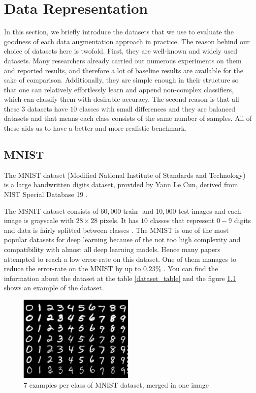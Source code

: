 \chapter{Data Representation}
\label{tit:data-representation}
In this section, we briefly introduce the datasets that we use to evaluate the goodness of each data
augmentation approach in practice. The reason behind our choice of datasets here is twofold. First,
they are well-known and widely used datasets. Many researchers already carried out numerous
experiments on them and reported results, and therefore a lot of baseline results are available for
the sake of comparison. Additionally, they are simple enough in their structure so that one can
relatively effortlessly learn and append non-complex classifiers, which can classify them with
desirable accuracy. The second reason is that all these $3$ datasets have $10$ classes with small
differences and they are balanced datasets and that means each class consists of the same number of
samples. All of these aids us to have a better and more realistic benchmark.

\section{MNIST}
The MNIST dataset (Modified National Institute of Standards and Technology) is a large handwritten
digits dataset, provided by Yann Le Cun, derived from NIST Special Database 19 \cite{NIST}.

The MSNIT dataset consists of $60,000$ train- and $10,000$ test-images and each image is grayscale
with $28 \times 28$ pixels. It has $10$ classes that represent $0-9$ digits and data is fairly
splitted between classes \cite{MNIST_data_reference}. The MNIST is one of the most popular datasets for
deep learning because of the not too high complexity and compatibility with almost all deep learning
models. Hence many papers attempted to reach a low error-rate on this dataset. One of them manages
to reduce the error-rate on the MNIST by up to $0.23\%$ \cite{MNIST_best_result_reference}. You can
find the information about the dataset at the table
\ref{dataset_table} and the figure \ref{fig:mnist_dataset_example} shows an example of the dataset.

\begin{figure}
  \centering
  \label{fig:mnist_dataset_example}
  \includegraphics[width=0.5\textwidth]{fig/mnist}
  \caption{7 examples per class of MNIST dataset, merged in one image \cite{MNIST_dataset_example}}
\end{figure}


